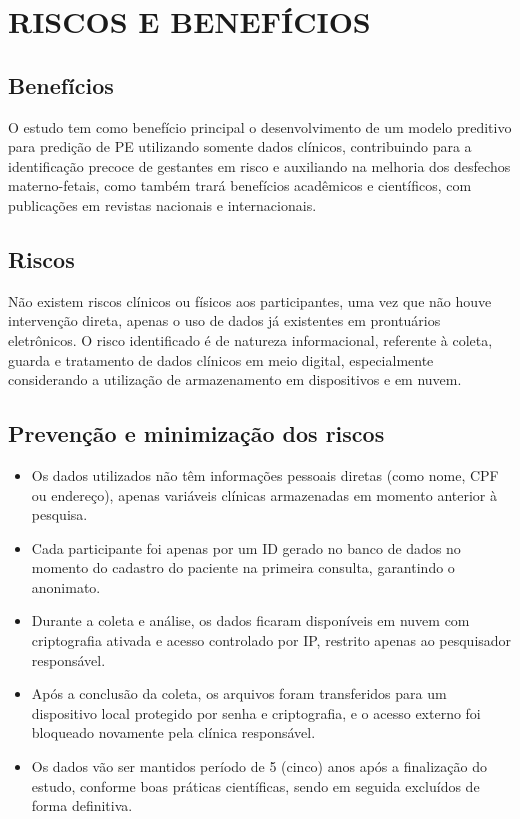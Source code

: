 \documentclass[12pt, a4paper]{report}
\theoremstyle{definition}
\theoremstyle{remark}
\theoremstyle{plain}
\begin{document}

\chapter{RISCOS E BENEFÍCIOS}
\thispagestyle{myheadings}
\section{Benefícios}

O estudo tem como benefício principal o desenvolvimento de um modelo preditivo para predição de PE utilizando somente dados clínicos, contribuindo para a identificação precoce de gestantes em risco e auxiliando na melhoria dos desfechos materno-fetais, como também trará benefícios acadêmicos e científicos, com publicações em revistas nacionais e internacionais.

\section{Riscos}
Não existem riscos clínicos ou físicos aos participantes, uma vez que não houve intervenção direta, apenas o uso de dados já existentes em prontuários eletrônicos. O risco identificado é de natureza informacional, referente à coleta, guarda e tratamento de dados clínicos em meio digital, especialmente considerando a utilização de armazenamento em dispositivos e em nuvem.

\section{Prevenção e minimização dos riscos}

\begin{itemize}
    \item Os dados utilizados não têm informações pessoais diretas (como nome, CPF ou endereço), apenas variáveis clínicas armazenadas em momento anterior à pesquisa. 
    
    \item Cada participante foi apenas por um ID gerado no banco de dados no momento do cadastro do paciente na primeira consulta, garantindo o anonimato. 
    
    \item Durante a coleta e análise, os dados ficaram disponíveis em nuvem com criptografia ativada e acesso controlado por IP, restrito apenas ao pesquisador responsável.
    
    \item Após a conclusão da coleta, os arquivos foram transferidos para um dispositivo local protegido por senha e criptografia, e o acesso externo foi bloqueado novamente pela clínica responsável. 
    
    \item Os dados vão ser mantidos período de 5 (cinco) anos após a finalização do estudo, conforme boas práticas científicas, sendo em seguida excluídos de forma definitiva.
\end{itemize}
\end{document}
